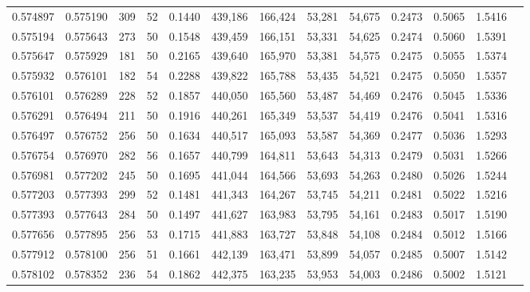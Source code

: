 \begin{tabular}{rrrrrrrrrrrrr}
0.574897 & 0.575190 &   309 &  52 &                                     0.1440 & 439,186 & 166,424 &  53,281 &  54,675 & 0.2473 & 0.5065 & 1.5416 \\
0.575194 & 0.575643 &   273 &  50 &                                     0.1548 & 439,459 & 166,151 &  53,331 &  54,625 & 0.2474 & 0.5060 & 1.5391 \\
0.575647 & 0.575929 &   181 &  50 &                                     0.2165 & 439,640 & 165,970 &  53,381 &  54,575 & 0.2475 & 0.5055 & 1.5374 \\
0.575932 & 0.576101 &   182 &  54 &                                     0.2288 & 439,822 & 165,788 &  53,435 &  54,521 & 0.2475 & 0.5050 & 1.5357 \\
0.576101 & 0.576289 &   228 &  52 &                                     0.1857 & 440,050 & 165,560 &  53,487 &  54,469 & 0.2476 & 0.5045 & 1.5336 \\
0.576291 & 0.576494 &   211 &  50 &                                     0.1916 & 440,261 & 165,349 &  53,537 &  54,419 & 0.2476 & 0.5041 & 1.5316 \\
0.576497 & 0.576752 &   256 &  50 &                                     0.1634 & 440,517 & 165,093 &  53,587 &  54,369 & 0.2477 & 0.5036 & 1.5293 \\
0.576754 & 0.576970 &   282 &  56 &                                     0.1657 & 440,799 & 164,811 &  53,643 &  54,313 & 0.2479 & 0.5031 & 1.5266 \\
0.576981 & 0.577202 &   245 &  50 &                                     0.1695 & 441,044 & 164,566 &  53,693 &  54,263 & 0.2480 & 0.5026 & 1.5244 \\
0.577203 & 0.577393 &   299 &  52 &                                     0.1481 & 441,343 & 164,267 &  53,745 &  54,211 & 0.2481 & 0.5022 & 1.5216 \\
0.577393 & 0.577643 &   284 &  50 &                                     0.1497 & 441,627 & 163,983 &  53,795 &  54,161 & 0.2483 & 0.5017 & 1.5190 \\
0.577656 & 0.577895 &   256 &  53 &                                     0.1715 & 441,883 & 163,727 &  53,848 &  54,108 & 0.2484 & 0.5012 & 1.5166 \\
0.577912 & 0.578100 &   256 &  51 &                                     0.1661 & 442,139 & 163,471 &  53,899 &  54,057 & 0.2485 & 0.5007 & 1.5142 \\
0.578102 & 0.578352 &   236 &  54 &                                     0.1862 & 442,375 & 163,235 &  53,953 &  54,003 & 0.2486 & 0.5002 & 1.5121 \\

\end{tabular}
